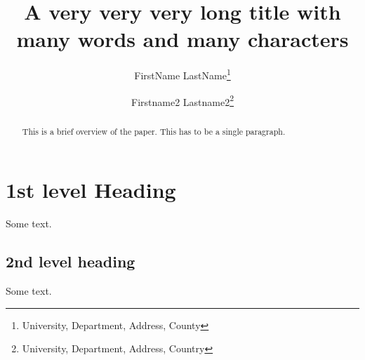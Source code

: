 \documentclass[english]{lni}
\begin{document}
\title[A short title]{A very very very long title with many words and many characters}
\author[FirstName LastName \and FirstName2 LastName2]
{FirstName LastName\footnote{University, Department, Address,
County } \and
Firstname2 Lastname2\footnote{University, Department, Address, Country
}}
\maketitle

\begin{abstract}
This is a brief overview of the paper. This has to be a single paragraph.
\end{abstract}
\section{1st level Heading}

Some text.

\subsection{2nd level heading}

Some text.

\end{document}
